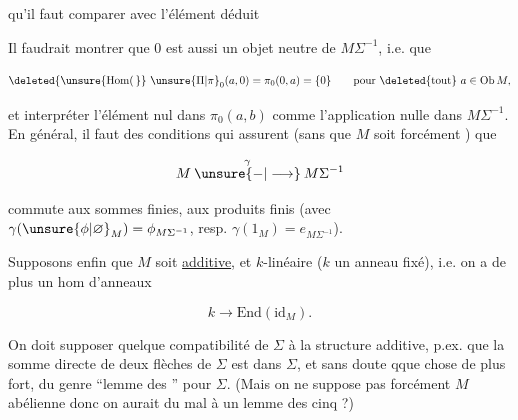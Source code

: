 
qu'il faut comparer avec l'élément déduit   


Il faudrait montrer que $0$ est aussi un objet neutre de $M\Sigma^{-1}$, i.e. que

\[
 \deleted{\unsure{\mathrm{Hom}(\,}}\ \unsure{\Pi|\pi}_0(a,0)=\pi_0(0,a)=\{0\}\qquad\text{pour }\deleted{\text{tout}}\ a\in\mathrm{Ob}\,M,
\]

et interpréter  l'élément nul dans $\pi_0(a,b)$ comme l'application nulle dans $M\Sigma^{-1}$.  En général, il faut des conditions qui assurent (sans que $M$ soit forcément ) que

\[
 M\mathbin{\overset{\gamma}{\unsure{-|\longrightarrow}}}M\Sigma^{-1}
\]

commute aux sommes finies,  aux produits finis (avec $\gamma(\unsure{\phi|\varnothing}_M)=\phi_{M\Sigma^{-1}}$, resp. $\gamma(1_M)=e_{M\Sigma^{-1}}$).


Supposons enfin que $M$ soit \uline{additive}, et   $k$-linéaire ($k$ un anneau fixé), i.e. on a de plus un hom d'anneaux

\[
 k\longrightarrow\mathrm{End}(\mathrm{id}_M).
\]

On doit supposer quelque compatibilité de $\Sigma$ à la structure additive, p.ex. que la somme directe de deux flèches de $\Sigma$ est dans $\Sigma$, et  sans doute qque chose de plus fort, du genre ``lemme des '' pour $\Sigma$. (Mais on ne suppose pas forcément $M$ abélienne donc on aurait du mal à  un lemme des cinq ?)
